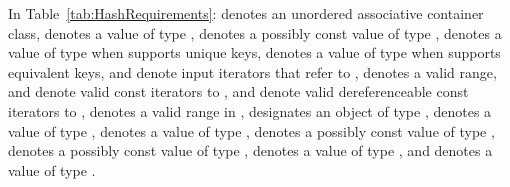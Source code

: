 \pnum
{}%
%
%
%
%
%
In Table~\ref{tab:HashRequirements}:
 denotes an unordered associative container class,
 denotes a value of type ,
 denotes a possibly const value of type ,
 denotes a value of type  when  supports unique keys,
 denotes a value of type  when  supports equivalent keys,
 and  denote input iterators that refer to ,
\tcode{[i, j)} denotes a valid range,
 and  denote valid const iterators to ,
 and  denote valid dereferenceable const iterators to ,
\tcode{[q1, q2)} denotes a valid range in ,
 designates an object of type ,
 denotes a value of type ,
 denotes a value of type ,
 denotes a possibly const value of type ,
 denotes a possibly const value of type ,
 denotes a value of type ,
and  denotes a value of type .

